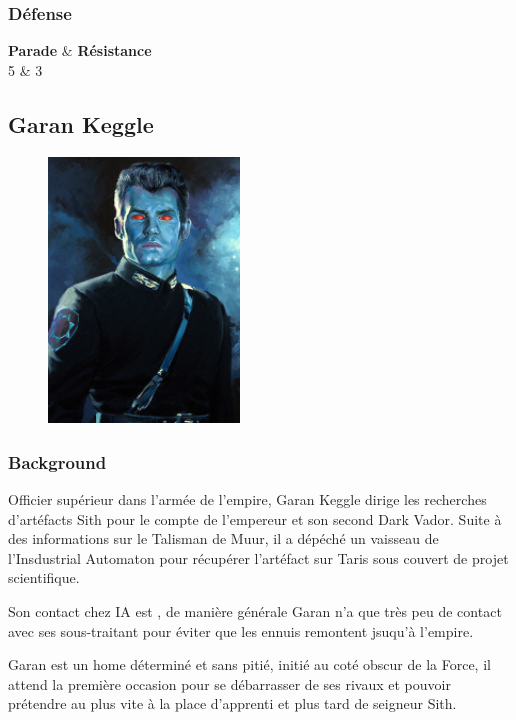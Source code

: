 \subsubsection{Défense}
\begin{itemtable}[ c c ]
    \textbf{Parade}     & \textbf{Résistance} \\
    5                   & 3 
\end{itemtable}

\newpage
\subsection{Garan Keggle}  \label{sec:garan-keggle}
\begin{figure}[h!]
    \centering
    \includegraphics[height=200pt]{_img/pnjs/garan-keggle.png}
\end{figure}
\vspace{-1\baselineskip}
\subsubsection{Background}
Officier supérieur dans l'armée de l'empire, Garan Keggle dirige les recherches d'artéfacts Sith pour le compte de l'empereur et son second Dark Vador. Suite à des informations sur le Talisman de Muur, il a dépéché un vaisseau de l'Insdustrial Automaton pour récupérer l'artéfact sur Taris sous couvert de projet scientifique.

Son contact chez IA est , de manière générale Garan n'a que très peu de contact avec ses sous-traitant pour éviter que les ennuis remontent jsuqu'à l'empire. 

Garan est un home déterminé et sans pitié, initié au coté obscur de la Force, il attend la première occasion pour se débarrasser de ses rivaux et pouvoir prétendre au plus vite à la place d'apprenti et plus tard de seigneur Sith.

